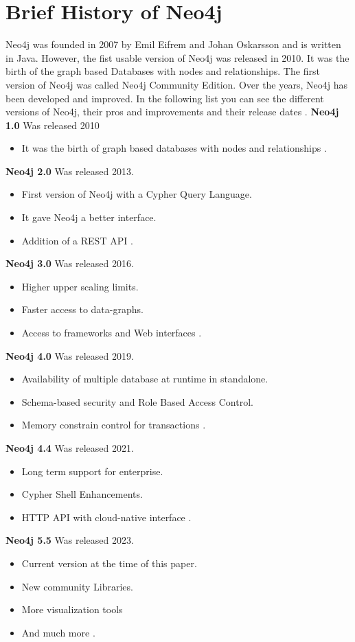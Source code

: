 
\section{Brief History of Neo4j} \label{sec:history}
Neo4j was founded in 2007 by Emil Eifrem and Johan Oskarsson and is written in Java.
However, the fist usable version of Neo4j was released in 2010.
It was the birth of the graph based Databases with nodes and relationships.
The first version of Neo4j was called Neo4j Community Edition.
Over the years, Neo4j has been developed and improved.
In the following list you can see the different versions of Neo4j, their pros and improvements and their release dates .
\textbf{Neo4j 1.0} Was released 2010
\begin{itemize}
    \item It was the birth of graph based databases with nodes and relationships \parencite{Neo4j:V1}.
\end{itemize}
\textbf{Neo4j 2.0} Was released 2013.
\begin{itemize}
    \item First version of Neo4j with a Cypher Query Language.
    \item It gave Neo4j a better interface.
    \item Addition of a REST API \parencite{Neo4j:V2}.
\end{itemize}
\textbf{Neo4j 3.0} Was released 2016.
\begin{itemize}
    \item Higher upper scaling limits.
    \item Faster access to data-graphs.
    \item Access to frameworks and Web interfaces \parencite{Neo4j:V3}.
\end{itemize}
\textbf{Neo4j 4.0} Was released 2019.
\begin{itemize}
    \item Availability of multiple database at runtime in standalone.
    \item Schema-based security and Role Based Access Control.
    \item Memory constrain control for transactions \parencite{Neo4j:V4}.
\end{itemize}
\textbf{Neo4j 4.4} Was released 2021.
\begin{itemize}
    \item Long term support for enterprise.
    \item Cypher Shell Enhancements.
    \item HTTP API with cloud-native interface \parencite{Neo4j:V4.4}.
\end{itemize}
\textbf{Neo4j 5.5} Was released 2023.
\begin{itemize}
    \item Current version at the time of this paper.
    \item New community Libraries.
    \item More visualization tools
    \item And much more \parencite{Neo4j:V5}.
\end{itemize}

